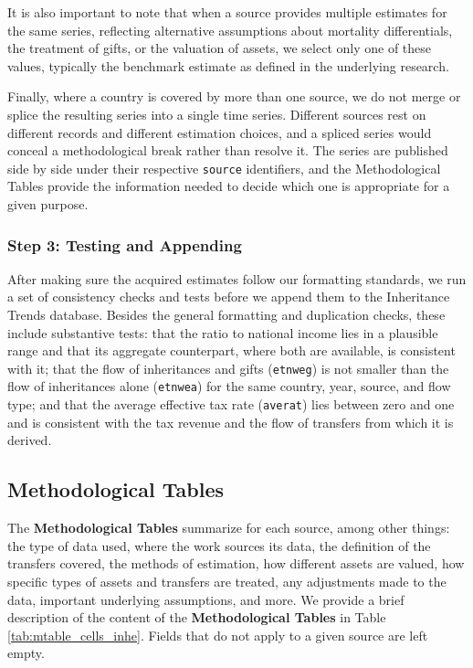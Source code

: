 \documentclass[
]{article}
\begin{document}
It is also important to note that when a source provides multiple
estimates for the same series, reflecting alternative assumptions about
mortality differentials, the treatment of gifts, or the valuation of
assets, we select only one of these values, typically the benchmark
estimate as defined in the underlying research.

Finally, where a country is covered by more than one source, we do not
merge or splice the resulting series into a single time series.
Different sources rest on different records and different estimation
choices, and a spliced series would conceal a methodological break
rather than resolve it. The series are published side by side under
their respective \texttt{source} identifiers, and the Methodological
Tables provide the information needed to decide which one is appropriate
for a given purpose.

\subsubsection{Step 3: Testing and
Appending}\label{step-3-testing-and-appending}

After making sure the acquired estimates follow our formatting
standards, we run a set of consistency checks and tests before we append
them to the Inheritance Trends database. Besides the general formatting
and duplication checks, these include substantive tests: that the ratio
to national income lies in a plausible range and that its aggregate
counterpart, where both are available, is consistent with it; that the
flow of inheritances and gifts (\texttt{etnweg}) is not smaller than the
flow of inheritances alone (\texttt{etnwea}) for the same country, year,
source, and flow type; and that the average effective tax rate
(\texttt{averat}) lies between zero and one and is consistent with the
tax revenue and the flow of transfers from which it is derived.

\clearpage

\subsection{Methodological Tables}\label{m_tables_inhe}

The \textbf{Methodological Tables} summarize for each source, among
other things: the type of data used, where the work sources its data,
the definition of the transfers covered, the methods of estimation, how
different assets are valued, how specific types of assets and transfers
are treated, any adjustments made to the data, important underlying
assumptions, and more. We provide a brief description of the content of
the \textbf{Methodological Tables} in Table \ref{tab:mtable_cells_inhe}.
Fields that do not apply to a given source are left empty.
\end{document}
